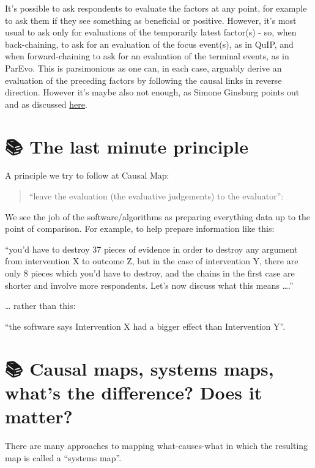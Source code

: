 \documentclass[
]{book}
\begin{document}
It's possible to ask respondents to evaluate the factors at any point, for example to ask them if they see something as beneficial or positive. However, it's most usual to ask only for evaluations of the temporarily latest factor(s) - so, when back-chaining, to ask for an evaluation of the focus event(s), as in QuIP, and when forward-chaining to ask for an evaluation of the terminal events, as in ParEvo. This is parsimonious as one can, in each case, arguably derive an evaluation of the preceding factors by following the causal links in reverse direction. However it's maybe also not enough, as Simone Ginsburg points out and as discussed \href{https://journals.sfu.ca/jmde/index.php/jmde_1/article/view/563}{here}.

\hypertarget{the-last-minute-principle}{%
\chapter{📚 The last minute principle}\label{the-last-minute-principle}}

A principle we try to follow at Causal Map:

\begin{quote}
``leave the evaluation (the evaluative judgements) to the evaluator'':
\end{quote}

We see the job of the software/algorithms as preparing everything data up to the point of comparison. For example, to help prepare information like this:

``you'd have to destroy 37 pieces of evidence in order to destroy any argument from intervention X to outcome Z, but in the case of intervention Y, there are only 8 pieces which you'd have to destroy, and the chains in the first case are shorter and involve more respondents. Let's now discuss what this means \ldots.''

\ldots{} rather than this:

``the software says Intervention X had a bigger effect than Intervention Y''.

\hypertarget{causal-maps-systems-maps-whats-the-difference-does-it-matter}{%
\chapter{📚 Causal maps, systems maps, what's the difference? Does it matter?}\label{causal-maps-systems-maps-whats-the-difference-does-it-matter}}

There are many approaches to mapping what-causes-what in which the resulting map is called a ``systems map''.
\end{document}
